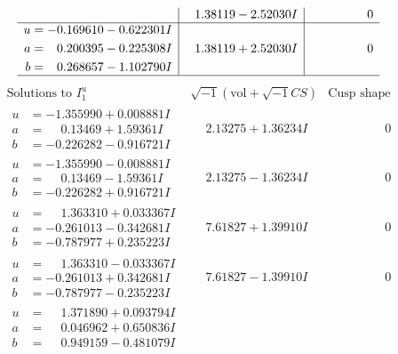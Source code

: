 \documentclass[1p]{elsarticle_modified}
\theoremstyle{definition}
\newcommand{\I}{\sqrt{-1}}
\begin{document}
$$\begin{array}{c|c|c}
 & \phantom{-}1.38119 - 2.52030 I & \phantom{-0.000000 } 0 \\ \hline\begin{aligned}
u &= -0.169610 - 0.622301 I \\
a &= \phantom{-}0.200395 - 0.225308 I \\
b &= \phantom{-}0.268657 - 1.102790 I\end{aligned}
 & \phantom{-}1.38119 + 2.52030 I & \phantom{-0.000000 } 0\\
 \hline 
 \end{array}$$\newpage$$\begin{array}{c|c|c}  
\text{Solutions to }I^u_{1}& \I (\text{vol} + \sqrt{-1}CS) & \text{Cusp shape}\\
 \hline 
\begin{aligned}
u &= -1.355990 + 0.008881 I \\
a &= \phantom{-}0.13469 + 1.59361 I \\
b &= -0.226282 - 0.916721 I\end{aligned}
 & \phantom{-}2.13275 + 1.36234 I & \phantom{-0.000000 } 0 \\ \hline\begin{aligned}
u &= -1.355990 - 0.008881 I \\
a &= \phantom{-}0.13469 - 1.59361 I \\
b &= -0.226282 + 0.916721 I\end{aligned}
 & \phantom{-}2.13275 - 1.36234 I & \phantom{-0.000000 } 0 \\ \hline\begin{aligned}
u &= \phantom{-}1.363310 + 0.033367 I \\
a &= -0.261013 - 0.342681 I \\
b &= -0.787977 + 0.235223 I\end{aligned}
 & \phantom{-}7.61827 + 1.39910 I & \phantom{-0.000000 } 0 \\ \hline\begin{aligned}
u &= \phantom{-}1.363310 - 0.033367 I \\
a &= -0.261013 + 0.342681 I \\
b &= -0.787977 - 0.235223 I\end{aligned}
 & \phantom{-}7.61827 - 1.39910 I & \phantom{-0.000000 } 0 \\ \hline\begin{aligned}
u &= \phantom{-}1.371890 + 0.093794 I \\
a &= \phantom{-}0.046962 + 0.650836 I \\
b &= \phantom{-}0.949159 - 0.481079 I\end{aligned}

\end{array}$$
\end{document}
